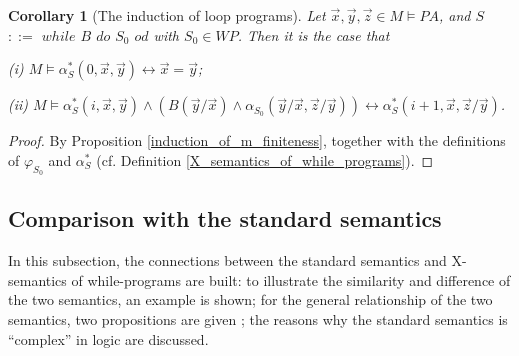 \documentclass[a4paper,11pt]{article}
\begin{document}
\newtheorem{induction_of_loop_programs}[X_semantics_of_while_programs]{Corollary}
\begin{induction_of_loop_programs}[The induction of loop programs]\label{induction_of_loop_programs}
Let $\vec{x},\vec{y},\vec{z}\in M\models PA$, and $S$ $::=$ $while$ $B$ $do$ $S_0$ $od$ with $S_0\in WP$. Then it is the case that

(i) $M\models \alpha_S^*(0,\vec{x},\vec{y}) \leftrightarrow \vec{x}=\vec{y}$;

(ii) $M\models \alpha_S^*(i,\vec{x},\vec{y})\wedge ( B(\vec{y}/\vec{x})\wedge \alpha_{S_0}(\vec{y}/\vec{x},\vec{z}/\vec{y}) ) \leftrightarrow \alpha_S^*(i+1,\vec{x},\vec{z}/\vec{y})$.
\end{induction_of_loop_programs}
\begin{proof}
By Proposition \ref{induction_of_m_finiteness}, together with the definitions of $\varphi_{S_0}$ and $\alpha_S^*$ (cf. Definition \ref{X_semantics_of_while_programs}).
\end{proof}

\subsection{Comparison with the standard semantics}\label{comparison_with_the_standard_semantics}

In this subsection, the connections between the standard semantics and X-semantics of while-programs are built: to illustrate the similarity and difference of the two semantics, an example is shown; for the general relationship of the two semantics, two propositions are given ; the reasons why the standard semantics is ``complex'' in logic are discussed.
\end{document}
